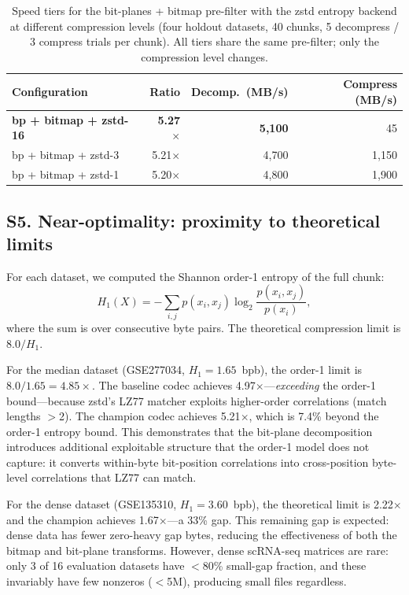 \documentclass[10pt,twocolumn,letterpaper]{article}
\begin{document}
\begin{table}[h]
\centering
\caption{Speed tiers for the bit-planes + bitmap pre-filter with the zstd entropy backend at different compression levels (four holdout datasets, 40 chunks, 5 decompress / 3 compress trials per chunk). All tiers share the same pre-filter; only the compression level changes.}
\label{tab:speed_tiers}
\footnotesize
\begin{tabular}{lrrr}
\toprule
Configuration & Ratio & Decomp.\ (MB/s) & Compress (MB/s) \\
\midrule
\textbf{bp + bitmap + zstd-16} & \textbf{5.27}$\times$ & \textbf{5{,}100} & 45 \\
bp + bitmap + zstd-3       & 5.21$\times$ & 4{,}700  & 1{,}150 \\
bp + bitmap + zstd-1       & 5.20$\times$ & 4{,}800  & 1{,}900 \\
\bottomrule
\end{tabular}
\end{table}

\subsection*{S5. Near-optimality: proximity to theoretical limits}

For each dataset, we computed the Shannon order-1 entropy of the full chunk:
\begin{equation}
H_1(X) = -\sum_{i,j} p(x_i, x_j) \log_2 \frac{p(x_i, x_j)}{p(x_i)},
\label{eq:order1}
\end{equation}
where the sum is over consecutive byte pairs.  The theoretical compression limit is $8.0 / H_1$.

For the median dataset (GSE277034, $H_1 = 1.65$~bpb), the order-1 limit is $8.0/1.65 = 4.85\times$.
The baseline codec achieves 4.97$\times$---\emph{exceeding} the order-1 bound---because zstd's LZ77 matcher exploits higher-order correlations (match lengths $>$2).
The champion codec achieves 5.21$\times$, which is 7.4\% beyond the order-1 entropy bound.
This demonstrates that the bit-plane decomposition introduces additional exploitable structure that the order-1 model does not capture: it converts within-byte bit-position correlations into cross-position byte-level correlations that LZ77 can match.

For the dense dataset (GSE135310, $H_1 = 3.60$~bpb), the theoretical limit is 2.22$\times$ and the champion achieves 1.67$\times$---a 33\% gap.
This remaining gap is expected: dense data has fewer zero-heavy gap bytes, reducing the effectiveness of both the bitmap and bit-plane transforms.
However, dense scRNA-seq matrices are rare: only 3 of 16 evaluation datasets have $<$80\% small-gap fraction, and these invariably have few nonzeros ($<$5M), producing small files regardless.
\end{document}
